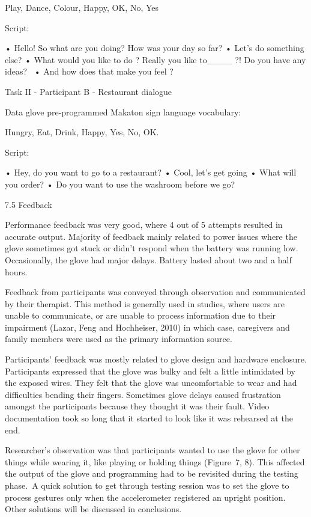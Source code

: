 Play, Dance, Colour, Happy, OK, No, Yes 

Script: 

•	Hello! So what are you doing? How was your day so far?
•	Let’s do something else?
•	What would you like to do ? Really you like to____ ?!  Do you have any ideas? 
•	And how does that make you feel ? 




Task II - Participant B - Restaurant dialogue 

Data glove pre-programmed Makaton sign language vocabulary: 

Hungry, Eat, Drink, Happy, Yes, No, OK. 

Script: 

•	Hey, do you want to go to a restaurant?
•	Cool, let’s get going
•	What will you order?
•	Do you want to use the washroom before we go? 

7.5 Feedback 

Performance feedback was very good, where 4 out of 5 attempts resulted in accurate output. Majority of feedback mainly related to power issues where the glove sometimes got stuck or didn’t respond when the battery was running low.  Occasionally, the glove had major delays. Battery lasted about two and a half hours. 

Feedback from participants was conveyed through observation and communicated by their therapist. This method is generally used in studies, where users are unable to communicate, or are unable to process information due to their impairment (Lazar, Feng and Hochheiser, 2010) in which case, caregivers and family members were used as the primary information source. 

Participants’ feedback was mostly related to glove design and hardware enclosure. Participants expressed that the glove was bulky and felt a little intimidated by the exposed wires. They felt that the glove was uncomfortable to wear and had difficulties bending their fingers. Sometimes glove delays caused frustration amongst the participants because they thought it was their fault. Video documentation took so long that it started to look like it was rehearsed at the end. 

Researcher’s observation was that participants wanted to use the glove for other things while wearing it, like playing or holding things (Figure 7, 8). This affected the output of the glove and programming had to be revisited during the testing phase. A quick solution to get through testing session was to set the glove to process gestures only when the accelerometer registered an upright position. Other solutions will be discussed in conclusions. 


